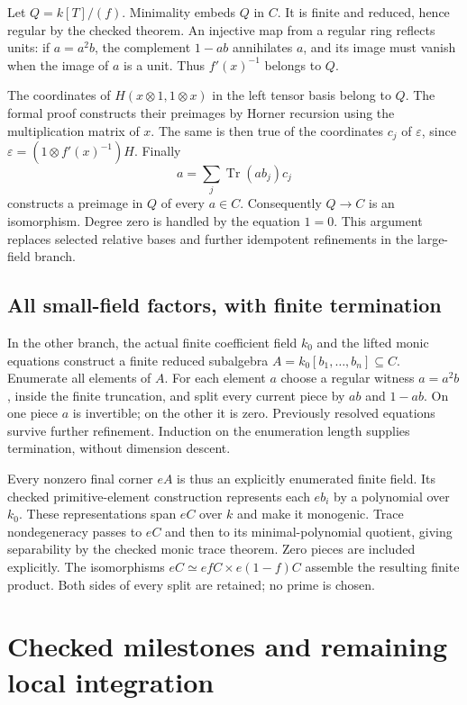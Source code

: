 \documentclass[11pt]{article}
\newcommand{\Tr}{\operatorname{Tr}}
\begin{document}
Let $Q=k[T]/(f)$. Minimality embeds $Q$ in $C$. It is finite and
reduced, hence regular by the checked theorem. An injective map from a
regular ring reflects units: if $a=a^2b$, the complement $1-ab$
annihilates $a$, and its image must vanish when the image of $a$ is a
unit. Thus $f'(x)^{-1}$ belongs to $Q$.

The coordinates of $H(x\otimes1,1\otimes x)$ in the left tensor basis
belong to $Q$. The formal proof constructs their preimages by Horner
recursion using the multiplication matrix of $x$. The same is then
true of the coordinates $c_j$ of $\varepsilon$, since
$\varepsilon=(1\otimes f'(x)^{-1})H$. Finally
\[
 a=\sum_j\Tr(ab_j)c_j
\]
constructs a preimage in $Q$ of every $a\in C$. Consequently $Q\to C$
is an isomorphism. Degree zero is handled by the equation $1=0$.
This argument replaces selected relative bases and further idempotent
refinements in the large-field branch.

\subsection{All small-field factors, with finite termination}

In the other branch, the actual finite coefficient field $k_0$ and
the lifted monic equations construct a finite reduced subalgebra
$A=k_0[b_1,\ldots,b_n]\subseteq C$. Enumerate all elements of $A$.
For each element $a$ choose a regular witness $a=a^2b$, inside the
finite truncation, and split every current piece by $ab$ and $1-ab$.
On one piece $a$ is invertible; on the other it is zero. Previously
resolved equations survive further refinement. Induction on the
enumeration length supplies termination, without dimension descent.

Every nonzero final corner $eA$ is thus an explicitly enumerated finite
field. Its checked primitive-element construction represents each
$eb_i$ by a polynomial over $k_0$. These representations span $eC$
over $k$ and make it monogenic. Trace nondegeneracy passes to $eC$
and then to its minimal-polynomial quotient, giving separability by
the checked monic trace theorem. Zero pieces are included explicitly.
The isomorphisms
$eC\simeq efC\times e(1-f)C$ assemble the resulting finite product.
Both sides of every split are retained; no prime is chosen.

\section{Checked milestones and remaining local integration}
\end{document}
